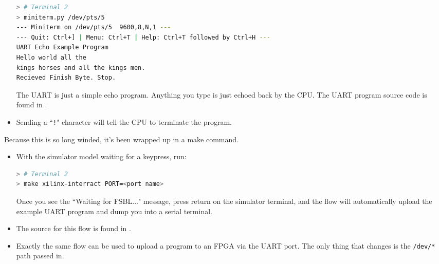 \begin{itemize}
\begin{lstlisting}[language=bash,style=block]
> # Terminal 2
> miniterm.py /dev/pts/5
--- Miniterm on /dev/pts/5  9600,8,N,1 ---
--- Quit: Ctrl+] | Menu: Ctrl+T | Help: Ctrl+T followed by Ctrl+H ---
UART Echo Example Program
Hello world all the
kings horses and all the kings men.
Recieved Finish Byte. Stop.
\end{lstlisting}
    
    The UART is just a simple echo program.
    Anything you type is just echoed back by the CPU.
    The UART program source code is found in .

\item

    Sending a ``{\tt !}" character will tell the CPU to terminate
    the program.

\end{itemize}

\noindent
Because this is so long winded, it's been wrapped up in a make command.

\begin{itemize}
\item With the simulator model waiting for a keypress, run:

\begin{lstlisting}[language=bash,style=block]
> # Terminal 2
> make xilinx-interract PORT=<port name>
\end{lstlisting}
    
    Once you see the ``Waiting for FSBL..." message, press return
    on the simulator terminal, and the flow will automatically
    upload the example UART program and dump you into a serial
    terminal.

\item The source for this flow is found in
    .

\item Exactly the same flow can be used to upload a program to an
    FPGA via the UART port.
    The only thing that changes is the {\tt /dev/*} path passed in.

\end{itemize}

